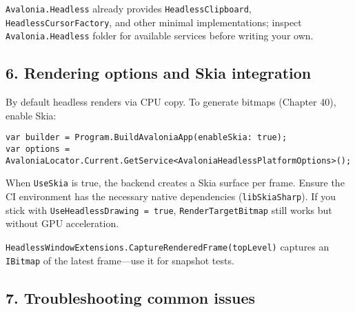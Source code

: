 \passthrough{\lstinline!Avalonia.Headless!} already provides
\passthrough{\lstinline!HeadlessClipboard!},
\passthrough{\lstinline!HeadlessCursorFactory!}, and other minimal
implementations; inspect \passthrough{\lstinline!Avalonia.Headless!}
folder for available services before writing your own.

\subsection{6. Rendering options and Skia
integration}\label{rendering-options-and-skia-integration}

By default headless renders via CPU copy. To generate bitmaps (Chapter
40), enable Skia:

\begin{lstlisting}
var builder = Program.BuildAvaloniaApp(enableSkia: true);
var options = AvaloniaLocator.Current.GetService<AvaloniaHeadlessPlatformOptions>();
\end{lstlisting}

When \passthrough{\lstinline!UseSkia!} is true, the backend creates a
Skia surface per frame. Ensure the CI environment has the necessary
native dependencies (\passthrough{\lstinline!libSkiaSharp!}). If you
stick with \passthrough{\lstinline!UseHeadlessDrawing = true!},
\passthrough{\lstinline!RenderTargetBitmap!} still works but without GPU
acceleration.

\passthrough{\lstinline!HeadlessWindowExtensions.CaptureRenderedFrame(topLevel)!}
captures an \passthrough{\lstinline!IBitmap!} of the latest frame---use
it for snapshot tests.

\subsection{7. Troubleshooting common
issues}\label{troubleshooting-common-issues}

